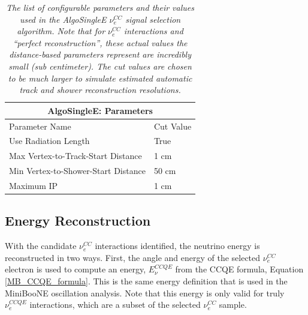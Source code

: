 \begin{table}
\begin{tabular}{ |p{8cm}|p{1.5cm}|  }
 \hline
 \multicolumn{2}{|c|}{AlgoSingleE: Parameters} \\
 \hline
 Parameter Name &  Cut Value \\
 \hline \hline
 Use Radiation Length &  True\\\hline
 
 Max Vertex-to-Track-Start Distance & 1 cm \\\hline

 Min Vertex-to-Shower-Start Distance & 50 cm \\\hline

 Maximum IP & 1 cm \\\hline

 \hline
\end{tabular}
\caption{\textit{The list of configurable parameters and their values used in the AlgoSingleE $\nu_e^{CC}$ signal selection algorithm. Note that for $\nu_e^{CC}$ interactions and ``perfect reconstruction'', these actual values the distance-based parameters represent are incredibly small (sub centimeter). The cut values are chosen to be much larger to simulate estimated automatic track and shower reconstruction resolutions.}}\label{algosinglee_table}
\end{table}










\subsection{Energy Reconstruction}\label{LEE_EnergyReco_section}

With the candidate $\nu_e^{CC}$ interactions identified, the neutrino energy is reconstructed in two ways. First, the angle and energy of the selected $\nu_e^{CC}$ electron is used to compute an energy, $E_\nu^{CCQE}$ from the CCQE formula, Equation \ref{MB_CCQE_formula}. This is the same energy definition that is used in the MiniBooNE oscillation analysis. Note that this energy is only valid for truly $\nu_e^{CCQE}$ interactions, which are a subset of the selected $\nu_e^{CC}$ sample.\\


